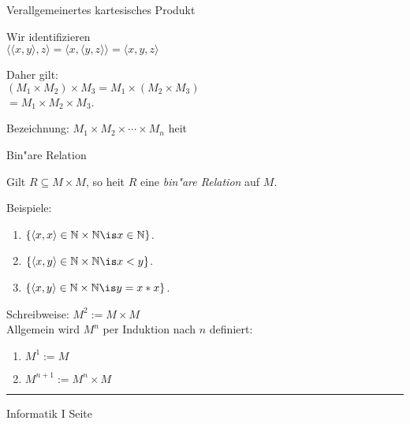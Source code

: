 \begin{slide}{}
\normalsize
\begin{center}
Verallgemeinertes kartesisches Produkt
\end{center}
\vspace{0.5cm}

\footnotesize
Wir identifizieren \\[0.3cm]
\hspace*{1.3cm} $\langle \langle x, y \rangle, z \rangle = \langle x, \langle y, z \rangle \rangle = \langle x, y, z \rangle$

Daher gilt: \\[0.3cm]
\hspace*{1.3cm} $(M_1 \times M_2) \times M_3 = M_1 \times (M_2 \times M_3)$ \\[0.3cm]
\hspace*{6.2cm} $ = M_1 \times M_2 \times M_3$.

Bezeichnung: $M_1 \times M_2 \times \cdots \times M_n$ hei\3t 
\begin{center}
\end{center}

\normalsize
\begin{center}
    Bin"are Relation
\end{center}
\footnotesize
Gilt $R \subseteq M \times M$, so hei\3t $R$ eine \emph{bin"are Relation} auf $M$.

Beispiele:
\begin{enumerate}
\item $\{ \langle x, x \rangle \in \mathbb{N} \times \mathbb{N} \is x \in \mathbb{N} \}$.
\item $\{ \langle x, y \rangle \in \mathbb{N} \times \mathbb{N} \is x < y \}$.
\item $\{ \langle x, y \rangle \in \mathbb{N} \times \mathbb{N} \is y = x * x \}$.
\end{enumerate}

Schreibweise: \quad $M^2 := M \times M$ \\
Allgemein wird $M^n$ per Induktion nach $n$ definiert:
\begin{enumerate}
\item $M^1 := M$ 
\item $M^{n+1} := M^n \times M$
\end{enumerate}

\vspace*{\fill}
\tiny \addtocounter{mypage}{1}
\rule{15cm}{1mm}
Informatik I  \hspace*{\fill} Seite 
\end{slide}

